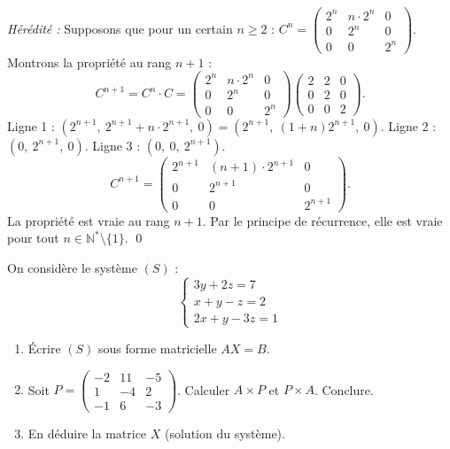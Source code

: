 \begin{solution}
	\textit{Hérédité :} Supposons que pour un certain $n\geq 2$ :
	$C^n = \begin{pmatrix}2^n&n\cdot2^n&0\\0&2^n&0\\0&0&2^n\end{pmatrix}$.
	Montrons la propriété au rang $n+1$ :
	\[
	C^{n+1} = C^n \cdot C
	= \begin{pmatrix}2^n&n\cdot2^n&0\\0&2^n&0\\0&0&2^n\end{pmatrix}
	\begin{pmatrix}2&2&0\\0&2&0\\0&0&2\end{pmatrix}.
	\]
	Ligne 1 : $(2^{n+1},\ 2^{n+1}+n\cdot2^{n+1},\ 0)
	= (2^{n+1},\ (1+n)2^{n+1},\ 0)$.
	Ligne 2 : $(0,\ 2^{n+1},\ 0)$.
	Ligne 3 : $(0,\ 0,\ 2^{n+1})$.
	\[
	C^{n+1} = \begin{pmatrix}2^{n+1}&(n+1)\cdot2^{n+1}&0\\0&2^{n+1}&0\\0&0&2^{n+1}\end{pmatrix}.
	\]
	La propriété est vraie au rang $n+1$. Par le principe de récurrence,
	elle est vraie pour tout $n\in\mathbb{N}^*\setminus\{1\}$. \qed
\end{solution}

\begin{exercice}{\etoilepleine\etoilepleine\etoilepleine}
	On considère le système $(S)$ :
	\[
	\begin{cases}
		3y + 2z = 7 \\
		x + y - z = 2 \\
		2x + y - 3z = 1
	\end{cases}
	\]
	\begin{enumerate}
		\item Écrire $(S)$ sous forme matricielle $AX = B$.
		\item Soit $P = \begin{pmatrix}-2&11&-5\\1&-4&2\\-1&6&-3\end{pmatrix}$.
		Calculer $A\times P$ et $P\times A$. Conclure.
		\item En déduire la matrice $X$ (solution du système).
	\end{enumerate}
\end{exercice}

